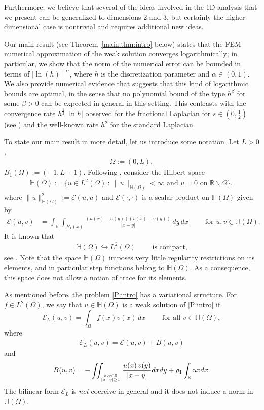 \documentclass[10 pt]{article}
\numberwithin{equation}{section}
\def\R{\mathbb{R}}
\def\mH{\mathbb{H}}
\def\cE{\mathcal{E}}
\begin{document}
Furthermore, we believe that several of the ideas involved in the 1D analysis that we present can be generalized to dimensions 2 and 3, but certainly the higher-dimensional case is nontrivial and requires additional new ideas.

Our main result (see Theorem~\ref{main:thm:intro} below) states that the FEM numerical approximation of the weak solution converges logarithmically; in particular, we show that the norm of the numerical error can be bounded in terms of $|\ln(h)|^{-\alpha}$, where $h$ is the discretization parameter and $\alpha\in(0,1)$. We also provide numerical evidence that suggests that this kind of logarithmic bounds are optimal, in the sense that no polynomial bound of the type $h^\beta$ for some $\beta>0$ can be expected in general in this setting.  This contrasts with the convergence rate $h^\frac{1}{2}|\ln h|$ observed for the fractional Laplacian for $s\in(0,\frac{1}{2})$ (see \cite[Theorem 3.31]{Bor17}) and the well-known rate $h^2$ for the standard Laplacian.

To state our main result in more detail, let us introduce some notation. Let $L>0$,
\begin{align*}
\Omega:=(0,L),
\end{align*}
 $B_1(\Omega):=(-1,L+1)$. Following \cite{CW19}, consider the Hilbert space
\begin{align*}
\mH(\Omega):=\{u\in L^2(\Omega)\::\: \|u\|_{\mathbb H(\Omega)}<\infty \text{ and }u=0\text{ on }\R\backslash \Omega\},
\end{align*}
where $\|u\|^2_{\mathbb H(\Omega)}:={\mathcal E}(u,u)$ and ${\mathcal E}(\cdot,\cdot)$ is a scalar product on $\mathbb H(\Omega)$ given by
\begin{align*}
    {\mathcal E}(u,v)&=\int_{\R}\int_{B_1(x)}\frac{(u(x)-u(y))(v(x)-v(y))}{|x-y|}\, dy\, dx \qquad \text{ for }u,v\in \mH(\Omega).
\end{align*}
It is known that
\begin{align}\label{c:em}
\mathbb H(\Omega)\hookrightarrow L^2(\Omega)\qquad \text{ is compact,}
\end{align}
see \cite[Theorem 2.1]{CdP18}. Note that the space $\mH(\Omega)$ imposes very little regularity restrictions on its elements, and in particular step functions belong to $\mH(\Omega)$. As a consequence, this space does not allow a notion of trace for its elements.

As mentioned before, the problem \eqref{P:intro} has a variational structure. For $f\in L^2(\Omega)$, we say that $u\in \mH(\Omega)$ is a weak solution of \eqref{P:intro} if
\begin{equation*}
    \cE_{L}(u,v)=\int_{\Omega} f(x) v(x)\, dx \qquad \text{ for all } v\in  \mH(\Omega),
\end{equation*}
where 
\begin{align}\label{cEL:def}
\cE_L(u,v)=\cE(u,v)+B(u,v) 
\end{align}
and
\begin{align}\label{eq:bilinear_B}
    B(u,v)=-\iint_{x,y\in\R\atop |x-y|\geq 1}\frac{u(x)\,v(y)}{|x-y|}dx dy+\rho_1\int_{\R}u v dx.
\end{align}
 The bilinear form $\cE_L$ is \emph{not} coercive in general and it does not induce a norm in $\mH(\Omega)$.
\end{document}
